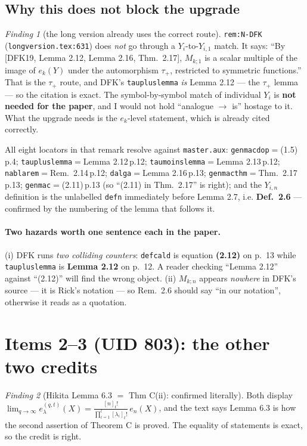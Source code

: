 \documentclass[11pt]{article}
\theoremstyle{remark}
\newtheorem{finding}{Finding}
\begin{document}
\subsection{Why this does not block the upgrade}
\begin{finding}[the long version already uses the correct route]
\texttt{rem:N-DFK} (\texttt{longversion.tex:631}) does \emph{not} go through a $Y_i$-to-$Y_{i,1}$
match. It says: ``By [DFK19, Lemma 2.12, Lemma 2.16, Thm.~2.17], $M_{k;1}$ is a scalar multiple
of the image of $e_k(Y)$ under the automorphism $\tau_+$, restricted to symmetric functions.''
That is the $\tau_+$ route, and DFK's \texttt{taupluslemma} \emph{is} Lemma 2.12 --- the $\tau_+$
lemma --- so the citation is exact. The symbol-by-symbol match of individual $Y_i$ is
\textbf{not needed for the paper}, and I would not hold ``analogue $\to$ is'' hostage to it.
What the upgrade needs is the $e_k$-level statement, which is already cited correctly.
\end{finding}
All eight locators in that remark resolve against \texttt{master.aux}:
\texttt{genmacdop}$=$(1.5)\,p.4; \texttt{taupluslemma}$=$Lemma 2.12\,p.12;
\texttt{taumoinslemma}$=$Lemma 2.13\,p.12; \texttt{nablarem}$=$Rem.~2.14\,p.12;
\texttt{dalga}$=$Lemma 2.16\,p.13; \texttt{genmacthm}$=$Thm.~2.17\,p.13;
\texttt{genmac}$=$(2.11)\,p.13 (so ``(2.11) in Thm.~2.17'' is right); and the
$Y_{i,n}$ definition is the unlabelled \texttt{defn} immediately before Lemma 2.7, i.e.
\textbf{Def.~2.6} --- confirmed by the numbering of the lemma that follows it.

\paragraph{Two hazards worth one sentence each in the paper.}
(i) DFK runs \emph{two colliding counters}: \texttt{defcald} is equation \textbf{(2.12)} on
p.~13 while \texttt{taupluslemma} is \textbf{Lemma 2.12} on p.~12. A reader checking ``Lemma
2.12'' against ``(2.12)'' will find the wrong object. (ii) $M_{k;n}$ appears \emph{nowhere} in
DFK's source --- it is Rick's notation --- so Rem.~2.6 should say ``in our notation'',
otherwise it reads as a quotation.

\section{Items 2--3 (UID 803): the other two credits}

\begin{finding}[Hikita Lemma 6.3 $=$ Thm C(ii): confirmed literally]
Both display $\lim_{q\to\infty}e^{(q,t)}_\lambda(X)=\frac{[n]_t!}{\prod_{i=1}^l[\lambda_i]_t!}\,
e_n(X)$, and the text says Lemma 6.3 is how the second assertion of Theorem C is proved. The
equality of statements is exact, so the credit is right.
\end{finding}
\end{document}
